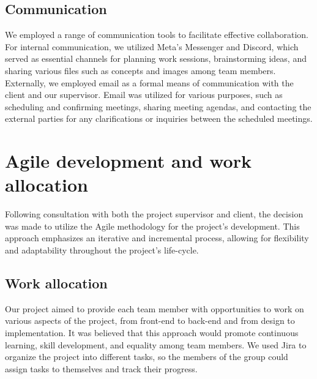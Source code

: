
\subsection{Communication}

We employed a range of communication tools to facilitate effective collaboration. For internal communication, we utilized Meta's Messenger and Discord, which served as essential channels for planning work sessions, brainstorming ideas, and sharing various files such as concepts and images among team members. \\

\noindent
Externally, we employed email as a formal means of communication with the client and our supervisor. Email was utilized for various purposes, such as scheduling and confirming meetings, sharing meeting agendas, and contacting the external parties for any clarifications or inquiries between the scheduled meetings. 


\section{Agile development and work allocation}

Following consultation with both the project supervisor and client, the decision was made to utilize the Agile methodology for the project's development. This approach emphasizes an iterative and incremental process, allowing for flexibility and adaptability throughout the project's life-cycle. 

\subsection{Work allocation}

Our project aimed to provide each team member with opportunities to work on various aspects of the project, from front-end to back-end and from design to implementation. It was believed that this approach would promote continuous learning, skill development, and equality among team members. We used Jira to organize the project into different tasks, so the members of the group could assign tasks to themselves and track their progress. 

